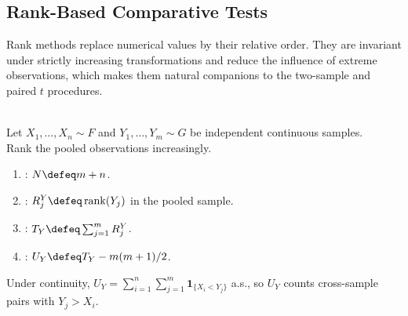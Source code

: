 \subsection{Rank-Based Comparative Tests}
\label{subsec:rank-based-comparative-tests}

Rank methods replace numerical values by their relative order.  They are invariant under strictly increasing transformations and reduce the influence of extreme observations, which makes them natural companions to the two-sample and paired $t$ procedures.

\begin{definition} \label{def:mann-whitney-rank-sum-statistics} \\
Let $X_1,\ldots,X_n\sim F$ and $Y_1,\ldots,Y_m\sim G$ be independent continuous samples.\\
Rank the pooled observations increasingly.
\begin{enumerate}[label=(\roman*)]
\setlength{\itemsep}{0pt}
\item {}: $N\defeq m+n$.
\item {}: $R_j^Y\defeq\operatorname{rank}(Y_j)$ in the pooled sample.
\item {}: $T_Y\defeq\sum_{j=1}^mR_j^Y$.
\item {}: $U_Y\defeq T_Y-m(m+1)/2$.
\end{enumerate}
Under continuity, $U_Y=\sum_{i=1}^n\sum_{j=1}^m\mathbf{1}_{\{X_i<Y_j\}}$ a.s., so $U_Y$ counts cross-sample pairs with $Y_j>X_i$.
\end{definition}

